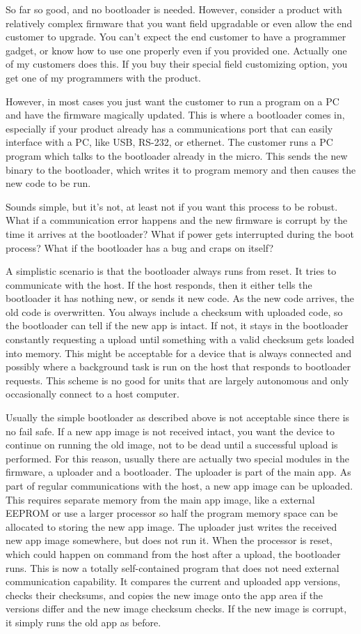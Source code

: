 \documentclass[a4paper]{article}
\begin{document}
So far so good, and no bootloader is needed. However, consider a product with
relatively complex firmware that you want field upgradable or even allow the end
customer to upgrade. You can't expect the end customer to have a programmer
gadget, or know how to use one properly even if you provided one. Actually one
of my customers does this. If you buy their special field customizing option,
you get one of my programmers with the product.

However, in most cases you just want the customer to run a program on a PC and
have the firmware magically updated. This is where a bootloader comes in,
especially if your product already has a communications port that can easily
interface with a PC, like USB, RS-232, or ethernet. The customer runs a PC
program which talks to the bootloader already in the micro. This sends the new
binary to the bootloader, which writes it to program memory and then causes the
new code to be run.

Sounds simple, but it's not, at least not if you want this process to be robust.
What if a communication error happens and the new firmware is corrupt by the
time it arrives at the bootloader? What if power gets interrupted during the
boot process? What if the bootloader has a bug and craps on itself?

A simplistic scenario is that the bootloader always runs from reset. It tries to
communicate with the host. If the host responds, then it either tells the
bootloader it has nothing new, or sends it new code. As the new code arrives,
the old code is overwritten. You always include a checksum with uploaded code,
so the bootloader can tell if the new app is intact. If not, it stays in the
bootloader constantly requesting a upload until something with a valid checksum
gets loaded into memory. This might be acceptable for a device that is always
connected and possibly where a background task is run on the host that responds
to bootloader requests. This scheme is no good for units that are largely
autonomous and only occasionally connect to a host computer.

Usually the simple bootloader as described above is not acceptable since there
is no fail safe. If a new app image is not received intact, you want the device
to continue on running the old image, not to be dead until a successful upload
is performed. For this reason, usually there are actually two special modules in
the firmware, a uploader and a bootloader. The uploader is part of the main app.
As part of regular communications with the host, a new app image can be
uploaded. This requires separate memory from the main app image, like a external
EEPROM or use a larger processor so half the program memory space can be
allocated to storing the new app image. The uploader just writes the received
new app image somewhere, but does not run it. When the processor is reset, which
could happen on command from the host after a upload, the bootloader runs. This
is now a totally self-contained program that does not need external
communication capability. It compares the current and uploaded app versions,
checks their checksums, and copies the new image onto the app area if the
versions differ and the new image checksum checks. If the new image is corrupt,
it simply runs the old app as before.
\end{document}
